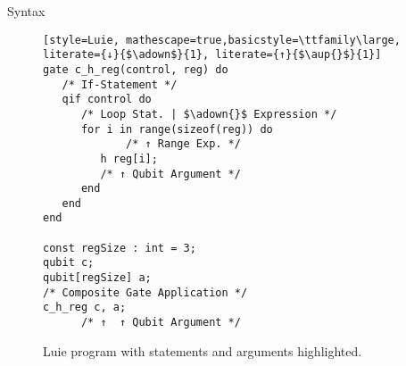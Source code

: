 \begin{frame}[fragile]{Syntax}
    \begin{minipage}{.50\textwidth}
        \begin{figure}[htp]
            \centering     
            \begin{lstlisting}[style=Luie, mathescape=true,basicstyle=\ttfamily\large, literate={↓}{$\adown$}{1}, literate={↑}{$\aup{}$}{1}] 
gate c_h_reg(control, reg) do
   /* If-Statement */
   qif control do
      /* Loop Stat. | $\adown{}$ Expression */
      for i in range(sizeof(reg)) do
             /* ↑ Range Exp. */
         h reg[i];
         /* ↑ Qubit Argument */
      end
   end
end

const regSize : int = 3; 
qubit c;
qubit[regSize] a;
/* Composite Gate Application */
c_h_reg c, a;  
      /* ↑  ↑ Qubit Argument */                 
            \end{lstlisting}
            \caption{Luie program with statements and arguments highlighted.}
        \end{figure}
    \end{minipage}
\end{frame}

%         


